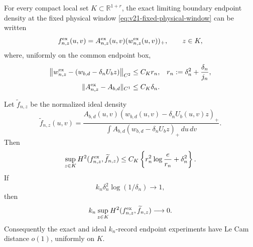 \begin{proposition}
\label{prop:v21-fixed-window-reduction}
For every compact local set $K\subset\mathbb R^{1+r}$, the exact limiting
boundary endpoint density at the fixed physical window
\eqref{eq:v21-fixed-physical-window} can be written
\begin{equation}\label{eq:v21-exact-endpoint-density}
 f^{\rm ex}_{n,z}(u,v)
 =A^{\rm ex}_{n,z}(u,v)(w^{\rm ex}_{n,z}(u,v))_+,
 \qquad z\in K,
\end{equation}
where, uniformly on the common endpoint box,
\begin{align}
 \bigl\|w^{\rm ex}_{n,z}
 -(w_{b,d}-\delta_nU_bz)\bigr\|_{C^2}
 &\le C_Kr_n,
 &r_n&:=\delta_n^2+\frac{\delta_n}{j_n},
                                      \label{eq:v21-support-remainder}\\
 \|A^{\rm ex}_{n,z}-A_{b,d}\|_{C^1}
 &\le C_K\delta_n.                  \label{eq:v21-amplitude-remainder}
\end{align}

Let $\widetilde f_{n,z}$ be the normalized ideal density
\begin{equation}\label{eq:v21-ideal-endpoint-density}
 \widetilde f_{n,z}(u,v)=
 \frac{A_{b,d}(u,v)(w_{b,d}(u,v)-\delta_nU_b(u,v)z)_+}
 {\displaystyle\int A_{b,d}
  (w_{b,d}-\delta_nU_bz)_+\,du\,dv}.
\end{equation}
Then
\begin{equation}\label{eq:v21-exact-ideal-hellinger}
 \sup_{z\in K}H^2(f^{\rm ex}_{n,z},\widetilde f_{n,z})
 \le C_K\left\{r_n^2\log\frac e{r_n}+\delta_n^2\right\}.
\end{equation}
If
\begin{equation}\label{eq:v21-critical-success-scale}
 k_n\delta_n^2\log(1/\delta_n)\longrightarrow1,
\end{equation}
then
\begin{equation}\label{eq:v21-product-exact-ideal}
 k_n\sup_{z\in K}
 H^2(f^{\rm ex}_{n,z},\widetilde f_{n,z})\longrightarrow0.
\end{equation}
Consequently the exact and ideal $k_n$-record endpoint experiments have
Le Cam distance $o(1)$, uniformly on $K$.
\end{proposition}

